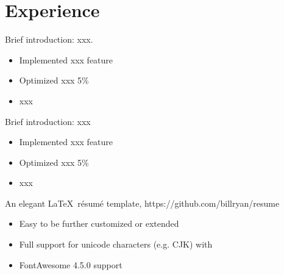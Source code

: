 \documentclass{resume}
\begin{document}


\section{\texorpdfstring{\faUsers}\ Experience}
Brief introduction: xxx.
\begin{itemize}
  \item Implemented xxx feature
  \item Optimized xxx 5\%
  \item xxx
\end{itemize}

Brief introduction: xxx
\begin{itemize}
  \item Implemented xxx feature
  \item Optimized xxx 5\%
  \item xxx
\end{itemize}

An elegant \LaTeX\ résumé template, https://github.com/billryan/resume
\begin{itemize}
  \item Easy to be further customized or extended
  \item Full support for unicode characters (e.g. CJK) with \XeLaTeX\
  \item FontAwesome 4.5.0 support
\end{itemize}

\end{document}
